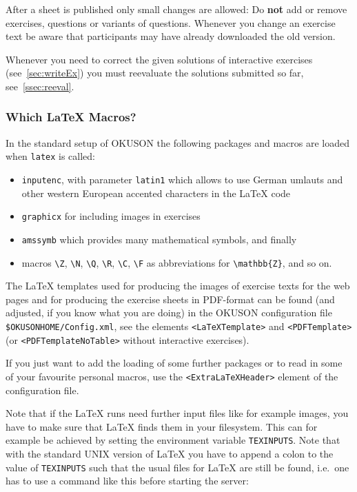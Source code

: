 \documentclass[12pt,openany,a4paper]{book}
\newcommand{\OKUSON}{\textsf{OKUSON}}
\begin{document}
After a sheet is published only small changes are allowed: Do \textbf{not}
add or remove exercises, questions or variants of questions. Whenever you
change an exercise text be aware that participants may have already
downloaded the old version. 

Whenever you need to correct the given solutions of interactive exercises
(see~\ref{sec:writeEx}) you must reevaluate the solutions submitted so far,
see~\ref{ssec:reeval}.

\subsubsection*{Which {\LaTeX} Macros?}

In the standard setup of {\OKUSON} the following packages and macros are 
loaded when \texttt{latex} is called: 

\begin{itemize}
\item \texttt{inputenc}, with parameter
\texttt{latin1} which allows to use German umlauts and other western
European accented characters in the {\LaTeX} code
\item \texttt{graphicx} for
including images in exercises 
\item  \texttt{amssymb} which provides many
mathematical symbols, and finally 
\item macros \verb+\Z+, \verb+\N+, \verb+\Q+, 
\verb+\R+, \verb+\C+, \verb+\F+ as
abbreviations for \verb+\mathbb{Z}+, and so on. 
\end{itemize}

The {\LaTeX} templates used for producing the images of exercise texts for
the web pages and for producing the exercise sheets in PDF-format can be
found (and adjusted, if you know what you are doing) in the {\OKUSON}
configuration  file \texttt{\$OKUSONHOME/Config.xml}, see the elements
\texttt{<LaTeXTemplate>} and \texttt{<PDFTemplate>} (or
\texttt{<PDFTemplateNoTable>} without interactive exercises).

If you just want to add the loading of some further packages or to read in
some of your favourite personal macros, use the \texttt{<ExtraLaTeXHeader>}
element of the configuration file.

Note that if the {\LaTeX} runs need further input files like for example
images, you have to make sure that {\LaTeX} finds them in your filesystem.
This can for example be achieved by setting the environment variable
\texttt{TEXINPUTS}. Note that with the standard UNIX version of {\LaTeX}
you have to append a colon to the value of \texttt{TEXINPUTS} such that the
usual files for {\LaTeX} are still be found, i.e.~one has to use a command
like this before starting the server:
\end{document}
